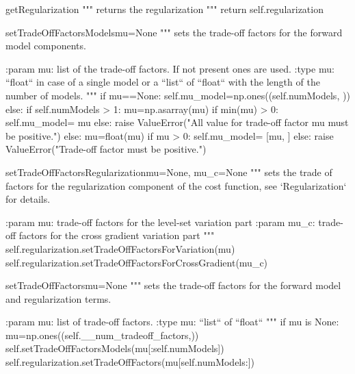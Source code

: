 \begin{methoddesc}[InversionCostFunction]{getRegularization}{}
        """
        returns the regularization
        """
        return self.regularization
\end{methoddesc}

        
\begin{methoddesc}[InversionCostFunction]{setTradeOffFactorsModels}{mu=None}
        """
        sets the trade-off factors for the forward model components.
        
        :param mu: list of the trade-off factors. If not present ones are used.
        :type mu: ``float`` in case of a single model or a ``list`` of ``float``
                  with the length of the number of models.
        """
        if mu==None:
            self.mu_model=np.ones((self.numModels, )) 
        else:
            if self.numModels > 1:
               mu=np.asarray(mu)
               if min(mu) > 0:
                  self.mu_model= mu
               else:
                  raise ValueError("All value for trade-off factor mu must be positive.")
            else:
              mu=float(mu)
              if mu > 0:
                  self.mu_model= [mu, ]
              else:
                  raise ValueError("Trade-off factor must be positive.") 
\end{methoddesc}
           
\begin{methoddesc}[InversionCostFunction]{setTradeOffFactorsRegularization}{mu=None, mu_c=None}
        """
        sets the trade of factors for the regularization component of the cost
        function, see `Regularization` for details.
        
        :param mu: trade-off factors for the level-set variation part 
        :param mu_c: trade-off factors for the cross gradient variation part 
        """
        self.regularization.setTradeOffFactorsForVariation(mu)
        self.regularization.setTradeOffFactorsForCrossGradient(mu_c)
\end{methoddesc}
        
\begin{methoddesc}[InversionCostFunction]{setTradeOffFactors}{mu=None}
        """
        sets the trade-off factors for the forward model and regularization
        terms. 

        :param mu: list of trade-off factors. 
        :type mu: ``list`` of ``float``
        """
        if mu is None:
            mu=np.ones((self.__num_tradeoff_factors,))
        self.setTradeOffFactorsModels(mu[:self.numModels])
        self.regularization.setTradeOffFactors(mu[self.numModels:])
\end{methoddesc}

